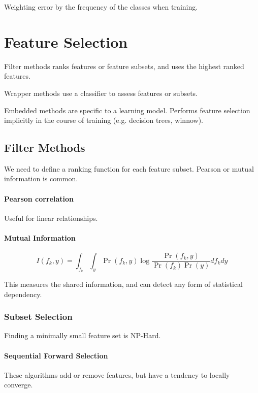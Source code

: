 \documentclass{idc_msc}
\begin{document}
Weighting error by the frequency of the classes when training.

\section{Feature Selection}

Filter methods ranks features or feature subsets, and uses the highest ranked features.

Wrapper methods use a classifier to assess features or subsets.

Embedded methods are specific to a learning model.
Performs feature selection implicitly in the course of training (e.g. decision trees, winnow).

\subsection{Filter Methods}

We need to define a ranking function for each feature subset. Pearson or mutual information is common.

\paragraph{Pearson correlation}

Useful for linear relationships.

\paragraph{Mutual Information}

\[I(f_k, y) = \int_{f_k} \int_y \Pr(f_k,y) \log \frac{\Pr(f_k,y)}{\Pr(f_k)\Pr(y)} df_k dy\]

This measures the shared information, and can detect any form of statistical dependency.

\subsubsection{Subset Selection}

Finding a minimally small feature set is NP-Hard.

\paragraph{Sequential Forward Selection}

These algorithms add or remove features, but have a tendency to locally converge.
\end{document}
